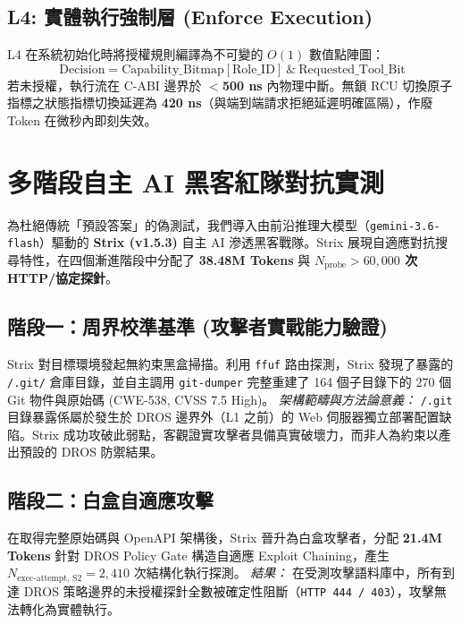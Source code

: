 \documentclass[conference]{IEEEtran}
\begin{document}
\subsection{L4: 實體執行強制層 (Enforce Execution)}
L4 在系統初始化時將授權規則編譯為不可變的 $O(1)$ 數值點陣圖：
\begin{equation}
\text{Decision} = \text{Capability\_Bitmap}[\text{Role\_ID}] \ \& \ \text{Requested\_Tool\_Bit}
\end{equation}
若未授權，執行流在 C-ABI 邊界於 \textbf{$<$500 ns} 內物理中斷。無鎖 RCU 切換原子指標之狀態指標切換延遲為 \textbf{420 ns}（與端到端請求拒絕延遲明確區隔），作廢 Token 在微秒內即刻失效。

\section{多階段自主 AI 黑客紅隊對抗實測}
為杜絕傳統「預設答案」的偽測試，我們導入由前沿推理大模型（\texttt{gemini-3.6-flash}）驅動的 \textbf{Strix (v1.5.3)} 自主 AI 滲透黑客戰隊。Strix 展現自適應對抗搜尋特性，在四個漸進階段中分配了 \textbf{38.48M Tokens} 與 \textbf{$N_{\text{probe}} > 60,000$ 次 HTTP/協定探針}。

\subsection{階段一：周界校準基準 (攻擊者實戰能力驗證)}
Strix 對目標環境發起無約束黑盒掃描。利用 \texttt{ffuf} 路由探測，Strix 發現了暴露的 \texttt{/.git/} 倉庫目錄，並自主調用 \texttt{git-dumper} 完整重建了 164 個子目錄下的 270 個 Git 物件與原始碼 (CWE-538, CVSS 7.5 High)。
\textit{架構範疇與方法論意義：} \texttt{/.git} 目錄暴露係屬於發生於 DROS 邊界外（L1 之前）的 Web 伺服器獨立部署配置缺陷。Strix 成功攻破此弱點，客觀證實攻擊者具備真實破壞力，而非人為約束以產出預設的 DROS 防禦結果。

\subsection{階段二：白盒自適應攻擊}
在取得完整原始碼與 OpenAPI 架構後，Strix 晉升為白盒攻擊者，分配 \textbf{21.4M Tokens} 針對 DROS Policy Gate 構造自適應 Exploit Chaining，產生 $N_{\text{exec-attempt, S2}} = 2,410$ 次結構化執行探測。
\textit{結果：} 在受測攻擊語料庫中，所有到達 DROS 策略邊界的未授權探針全數被確定性阻斷（\texttt{HTTP 444 / 403}），攻擊無法轉化為實體執行。
\end{document}
